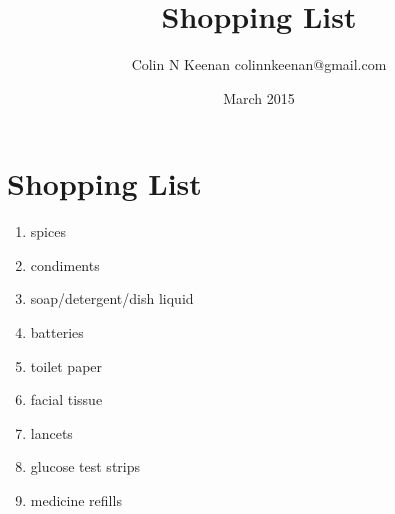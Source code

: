 \documentclass[12pt,letterpaper]{article}
\newcommand{\mytitle}{Shopping List}
\begin{document}
\title{\mytitle{}}
\author{Colin N Keenan colinnkeenan@gmail.com}
\date{March 2015}
\section*{\mytitle{}}
\begin{enumerate}
	\item spices
	\item condiments
	\item soap/detergent/dish liquid
	\item batteries
	\item toilet paper
	\item facial tissue
	\item lancets
	\item glucose test strips
	\item medicine refills
\end{enumerate}
\end{document}
